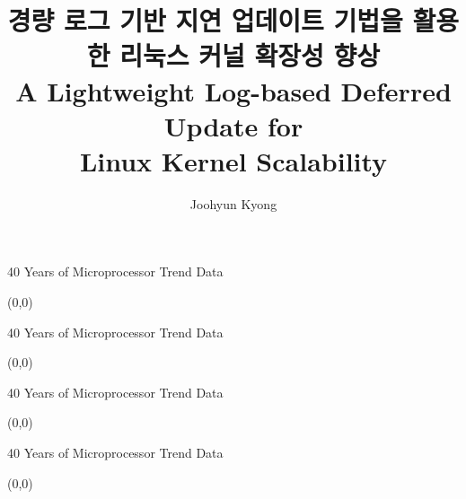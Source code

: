 \documentclass[english]{beamer} %
\begin{document}
\title[Memory Scalability]{
경량 로그 기반 지연 업데이트 기법을 활용한 리눅스 커널 확장성 향상 \\
\small{A Lightweight Log-based Deferred Update
for \\Linux Kernel Scalability}}

\author{Joohyun Kyong}


\begin{frame}
  \titlepage
\end{frame}

\begin{frame}{40 Years of Microprocessor Trend Data}
\begin{textblock}{1}(0,0)
\end{textblock}
\end{frame}


\begin{frame}{40 Years of Microprocessor Trend Data}
\begin{textblock}{1}(0,0)
\end{textblock}
\end{frame}

\begin{frame}{40 Years of Microprocessor Trend Data}
\begin{textblock}{1}(0,0)
\end{textblock}
\end{frame}


\begin{frame}{40 Years of Microprocessor Trend Data}
\begin{textblock}{1}(0,0)
\end{textblock}
\end{frame}
\end{document}
